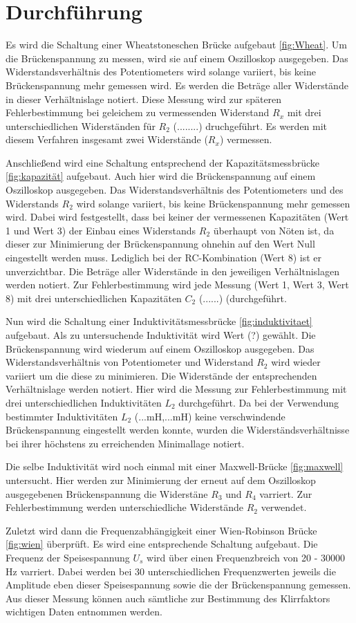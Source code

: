 \section{Durchführung}
\label{sec:Durchführung}

Es wird die Schaltung einer Wheatstoneschen Brücke aufgebaut \ref{fig:Wheat}.
Um die Brückenspannung zu messen, wird sie auf einem Oszilloskop ausgegeben.
Das Widerstandsverhältnis des Potentiometers wird solange variiert, bis keine
Brückenspannung mehr gemessen wird. Es werden die Beträge aller Widerstände in
dieser Verhältnislage notiert. Diese Messung wird zur späteren Fehlerbestimmung bei geleichem zu
vermessenden Widerstand $R_x$ mit drei unterschiedlichen Widerständen für $R_2$ (........) druchgeführt.
Es werden mit diesem Verfahren insgesamt zwei Widerstände ($R_x$) vermessen.

Anschließend wird eine Schaltung entsprechend der Kapazitätsmessbrücke \ref{fig:kapazität}
aufgebaut. Auch hier wird die Brückenspannung auf einem Oszilloskop ausgegeben.
Das Widerstandsverhältnis des Potentiometers und des Widerstands $R_2$ wird solange variiert, bis keine
Brückenspannung mehr gemessen wird. Dabei wird festgestellt, dass bei keiner der
vermessenen Kapazitäten (Wert 1 und Wert 3) der Einbau eines Widerstands $R_2$
überhaupt von Nöten ist, da dieser zur Minimierung der Brückenspannung ohnehin auf
den Wert Null eingestellt werden muss. Lediglich bei der RC-Kombination (Wert 8)
ist er unverzichtbar. Die Beträge aller Widerstände in den jeweiligen Verhältnislagen
werden notiert. Zur Fehlerbestimmung wird jede Messung (Wert 1, Wert 3, Wert 8)
mit drei unterschiedlichen Kapazitäten $C_2$ (......) (durchgeführt.

Nun wird die Schaltung einer Induktivitätsmessbrücke \ref{fig:induktivitaet} aufgebaut.
Als zu untersuchende Induktivität wird Wert (?) gewählt.
Die Brückenspannung wird wiederum auf einem Oszilloskop ausgegeben.
Das Widerstandsverhältnis von Potentiometer und Widerstand $R_2$ wird wieder
variiert um die diese zu minimieren. Die Widerstände der entsprechenden
Verhältnislage werden notiert. Hier wird die Messung zur Fehlerbestimmung mit
drei unterschiedlichen Induktivitäten $L_2$ durchgeführt.
Da bei der Verwendung bestimmter Induktivitäten $L_2$ (...mH,...mH) keine verschwindende
Brückenspannung eingestellt werden konnte, wurden die Widerständsverhältnisse
bei ihrer höchstens zu erreichenden Minimallage notiert.

Die selbe Induktivität wird noch einmal mit einer Maxwell-Brücke \ref{fig:maxwell} untersucht.
Hier werden zur Minimierung der erneut auf dem Oszilloskop ausgegebenen Brückenspannung
die Widerstäne $R_3$ und $R_4$ varriert. Zur Fehlerbestimmung werden unterschiedliche
Widerstände $R_2$ verwendet.

Zuletzt wird dann die Frequenzabhängigkeit einer Wien-Robinson Brücke \ref{fig:wien}
überprüft. Es wird eine entsprechende Schaltung aufgebaut. Die Frequenz der
Speisespannung $U_s$ wird über einen Frequenzbreich von 20 - 30000 Hz varriert.
Dabei werden bei 30 unterschiedlichen Frequenzwerten jeweils die Amplitude eben dieser
Speisespannung sowie die der Brückenspannung gemessen. Aus dieser Messung können
auch sämtliche zur Bestimmung des Klirrfaktors wichtigen Daten entnommen werden.
